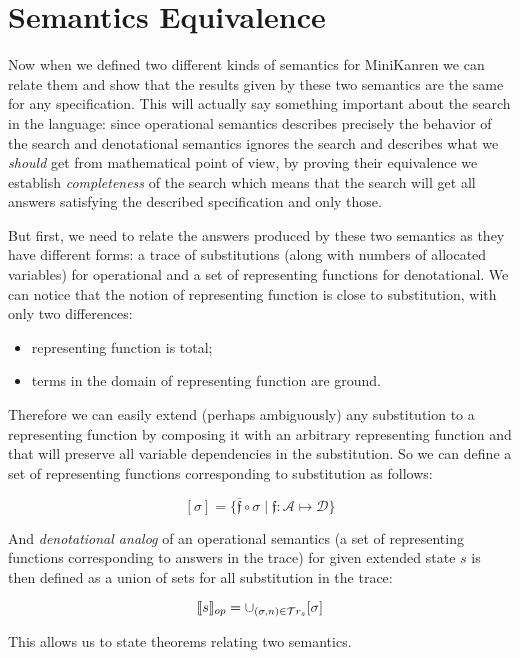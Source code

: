 \section{Semantics Equivalence}
\label{equivalence}

Now when we defined two different kinds of semantics for MiniKanren we can relate them and show that the results given by these two semantics are the same for any specification.
This will actually say something important about the search in the language: since operational semantics describes precisely the behavior of the search and denotational semantics
ignores the search and describes what we \emph{should} get from mathematical point of view, by proving their equivalence we establish \emph{completeness} of the search which
means that the search will get all answers satisfying the described specification and only those.

But first, we need to relate the answers produced by these two semantics as they have different forms: a trace of substitutions (along with numbers of allocated variables)
for operational and a set of representing functions for denotational. We can notice that the notion of representing function is close to substitution, with only two differences:

\begin{itemize}
\item representing function is total;
\item terms in the domain of representing function are ground.
\end{itemize}

Therefore we can easily extend (perhaps ambiguously) any substitution to a representing function by composing it with an arbitrary representing function and that will
preserve all variable dependencies in the substitution. So we can define a set of representing functions corresponding to substitution as follows:

\[
[\sigma] = \{\overline{\mathfrak f} \circ \sigma \mid \mathfrak{f}:\mathcal{A}\mapsto\mathcal{D}\}
\]

And \emph{denotational analog} of an operational semantics (a set of representing functions corresponding to answers in the trace) for given extended state $s$ is
then defined as a union of sets for all substitution in the trace:

\[
\llbracket{s}\rrbracket_{op} = \cup_{(\sigma, n) \in \mathcal{T}r_{s}} [\sigma]
\]

This allows us to state theorems relating two semantics.

